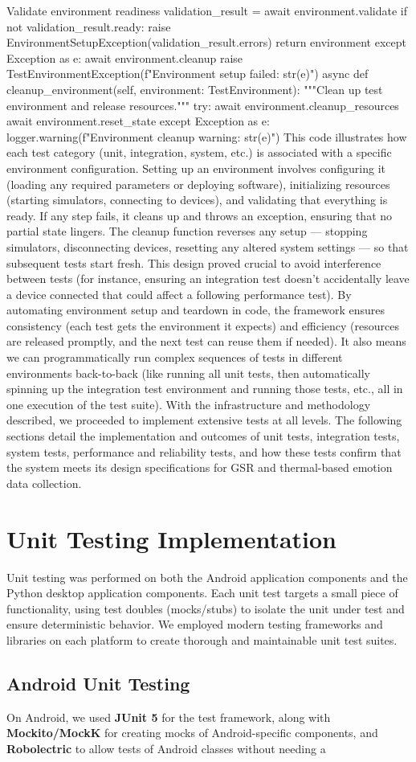 Validate environment readiness validation_result = await environment.validate if not validation_result.ready: raise EnvironmentSetupException(validation_result.errors) return environment except Exception as e: await environment.cleanup raise TestEnvironmentException(f"Environment setup failed: {str(e)}") async def cleanup_environment(self, environment: TestEnvironment): """Clean up test environment and release resources.""" try: await environment.cleanup_resources await environment.reset_state except Exception as e: logger.warning(f"Environment cleanup warning: {str(e)}") This code illustrates how each test category (unit, integration, system, etc.) is associated with a specific environment configuration. Setting up an environment involves configuring it (loading any required parameters or deploying software), initializing resources (starting simulators, connecting to devices), and validating that everything is ready. If any step fails, it cleans up and throws an exception, ensuring that no partial state lingers. The cleanup function reverses any setup --- stopping simulators, disconnecting devices, resetting any altered system settings --- so that subsequent tests start fresh. This design proved crucial to avoid interference between tests (for instance, ensuring an integration test doesn't accidentally leave a device connected that could affect a following performance test). By automating environment setup and teardown in code, the framework ensures consistency (each test gets the environment it expects) and efficiency (resources are released promptly, and the next test can reuse them if needed). It also means we can programmatically run complex sequences of tests in different environments back-to-back (like running all unit tests, then automatically spinning up the integration test environment and running those tests, etc., all in one execution of the test suite). With the infrastructure and methodology described, we proceeded to implement extensive tests at all levels. The following sections detail the implementation and outcomes of unit tests, integration tests, system tests, performance and reliability tests, and how these tests confirm that the system meets its design specifications for GSR and thermal-based emotion data collection. \section{Unit Testing Implementation} Unit testing was performed on both the Android application components and the Python desktop application components. Each unit test targets a small piece of functionality, using test doubles (mocks/stubs) to isolate the unit under test and ensure deterministic behavior. We employed modern testing frameworks and libraries on each platform to create thorough and maintainable unit test suites. \subsection{Android Unit Testing} On Android, we used \textbf{JUnit 5} for the test framework, along with \textbf{Mockito/MockK} for creating mocks of Android-specific components, and \textbf{Robolectric} to allow tests of Android classes without needing a 